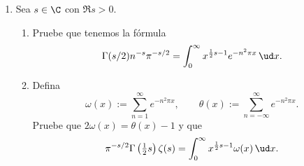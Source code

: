 \documentclass[11pt, reqno]{amsart}
\begin{document}
\begin{enumerate}
	\item Sea $s \in \C$ con $\Re s > 0$.
		\begin{enumerate}
			\item Pruebe que tenemos la fórmula
				\[
					\Gamma(s/2) n^{-s} \pi^{-s/2} = \int_{0}^{\infty} x^{\frac{1}{2} s - 1} e^{-n^2 \pi x} \, \ud x.
				\]

			\item Defina
				\[
					\omega(x) := \sum_{n=1}^{\infty} e^{-n^2 \pi x}, \qquad \theta(x) := \sum_{n=-\infty}^{\infty}
					e^{-n^2 \pi x}.
				\]
				Pruebe que $2 \omega(x) = \theta(x) - 1$ y que
				\[
					\pi^{-s/2}\Gamma\left( \tfrac{1}{2}s \right) \zeta(s) = \int_{0}^{\infty} x^{\frac{1}{2}s - 1}
					\omega(x) \, \ud x.
				\]

		\end{enumerate}
		\nocite{davenport:multiplicative}
\end{enumerate}
\end{document}
